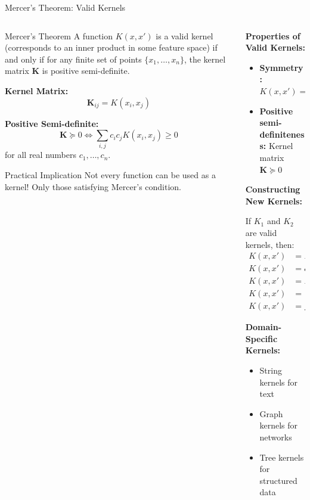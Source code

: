 \documentclass[8pt,aspectratio=1610]{beamer}
\begin{document}
\begin{frame}{Mercer's Theorem: Valid Kernels}
\begin{columns}[t]
\begin{column}{0.48\textwidth}
\begin{block}{Mercer's Theorem}
A function $K(x, x')$ is a valid kernel (corresponds to an inner product in some feature space) if and only if for any finite set of points $\{x_1, \ldots, x_n\}$, the kernel matrix $\mathbf{K}$ is positive semi-definite.
\end{block}

\vspace{0.3cm}
\textbf{Kernel Matrix:}
$$\mathbf{K}_{ij} = K(x_i, x_j)$$

\vspace{0.3cm}
\textbf{Positive Semi-definite:}
$$\mathbf{K} \succeq 0 \iff \sum_{i,j} c_i c_j K(x_i, x_j) \geq 0$$
for all real numbers $c_1, \ldots, c_n$.

\vspace{0.3cm}
\begin{alertblock}{Practical Implication}
Not every function can be used as a kernel! Only those satisfying Mercer's condition.
\end{alertblock}
\end{column}

\begin{column}{0.48\textwidth}
\textbf{Properties of Valid Kernels:}
\vspace{0.2cm}

\begin{itemize}
\setlength{\itemsep}{1pt}
\item \textbf{Symmetry:} $K(x, x') = K(x', x)$
\item \textbf{Positive semi-definiteness:} Kernel matrix $\mathbf{K} \succeq 0$
\end{itemize}

\vspace{0.3cm}
\textbf{Constructing New Kernels:}
\vspace{0.2cm}

If $K_1$ and $K_2$ are valid kernels, then:
\begin{align}
K(x, x') &= K_1(x, x') + K_2(x, x') \\
K(x, x') &= c \cdot K_1(x, x'), \quad c > 0 \\
K(x, x') &= K_1(x, x') \cdot K_2(x, x') \\
K(x, x') &= \exp(K_1(x, x')) \\
K(x, x') &= f(x) K_1(x, x') f(x')
\end{align}

\vspace{0.3cm}
\textbf{Domain-Specific Kernels:}
\begin{itemize}
\setlength{\itemsep}{1pt}
\item String kernels for text
\item Graph kernels for networks
\item Tree kernels for structured data
\end{itemize}
\end{column}
\end{columns}
\end{frame}
\end{document}
